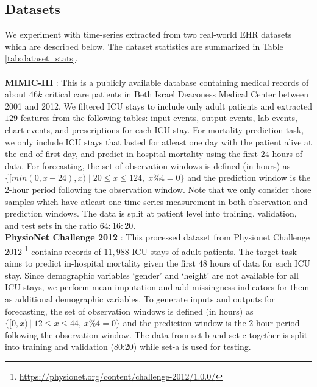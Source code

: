 \subsection{Datasets}
We experiment with time-series extracted from two real-world EHR datasets which are described below. 
The dataset statistics are summarized in Table \ref{tab:dataset_stats}.  \\ \\
\noindent
\textbf{MIMIC-III} \citep{mimiciii}: This is a publicly available database containing medical records of about $46k$ critical care patients in Beth Israel Deaconess Medical Center between 2001 and 2012. We filtered ICU stays to include only adult patients and extracted  $129$ features from the following tables: input events, output events, lab events, chart events, and prescriptions for each ICU stay. For mortality prediction task, we only include ICU stays that lasted for atleast one day with the patient alive at the end of first day, and predict in-hospital mortality using the first $24$ hours of data. For forecasting, the set of observation windows is defined (in hours) as $\{ [min(0, x-24), x) \;|\; 20\leq x\leq 124,\; x\%4=0\}$ and the prediction window is the $2$-hour period following the observation window. Note that we only consider those samples which have atleast one time-series measurement in both observation and prediction windows. The data is split at patient level into training, validation, and test sets in the ratio $64:16:20$.
\\ 


\noindent
\textbf{PhysioNet Challenge 2012} \citep{goldberger2000physiobank}: This processed dataset from Physionet Challenge 2012 \footnote{\url{https://physionet.org/content/challenge-2012/1.0.0/}} contains records of $11,988$  ICU stays of adult patients. 
The target task aims to predict in-hospital mortality given the first $48$ hours of data for each ICU stay. Since demographic variables `gender' and `height' are not available for all ICU stays, we perform mean imputation and add missingness indicators for them as additional demographic variables.
To generate inputs and outputs for forecasting, the set of observation windows is defined (in hours) as $\{[0, x)\,|\;12\leq x\leq 44,\,x\%4=0\}$ and the prediction window is the $2$-hour period following the observation window. The data from set-b and set-c together is split into training and validation (80:20) while set-a is used for testing.






